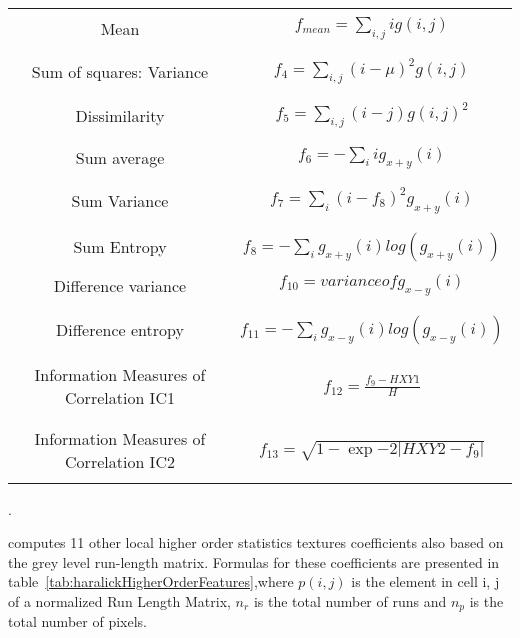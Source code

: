 \begin{table}
\begin{center}
\begin{tabular}{|c|c|}
\hline
& \\
Mean & $ f_{mean} = \sum_{i, j}i g(i, j) $ \\
& \\
\hline
& \\
Sum of squares: Variance & $ f_4 = \sum_{i, j}(i - \mu)^2 g(i, j) $ \\
& \\
\hline
& \\
Dissimilarity & $ f_5 = \sum_{i, j}(i - j) g(i, j)^2 $ \\
& \\
\hline
& \\
Sum average &  $ f_6 = -\sum_{i}i g_{x+y}(i) $ \\
& \\
\hline
& \\
Sum Variance & $ f_7 = \sum_{i}(i - f_8)^2 g_{x+y}(i) $ \\
& \\
\hline
& \\
Sum Entropy & $ f_8 = -\sum_{i}g_{x+y}(i) log (g_{x+y}(i)) $ \\
& \\
\hline
Difference variance & $ f_{10} = variance of g_{x-y}(i) $ \\
& \\
\hline
& \\
Difference entropy & $ f_{11} = -\sum_{i}g_{x-y}(i) log (g_{x-y}(i)) $ \\
& \\
\hline
& \\
Information Measures of Correlation IC1 & $ f_{12} = \frac{f_9 - HXY1}{H} $ \\
& \\
\hline
& \\
Information Measures of Correlation IC2 & $ f_{13} = \sqrt{1 - \exp{-2}|HXY2 - f_9|} $ \\
& \\
\hline
\end{tabular}
\end{center}
\label{tab:haralickAdvancedFeatures}
\end{table}.

 computes 11
other local higher order statistics textures coefficients also based on the grey
level run-length matrix. Formulas for these coefficients are presented in
table~\ref{tab:haralickHigherOrderFeatures},where $p(i, j)$ is the element in
cell i, j of a normalized Run Length Matrix, $n_r$ is the total number of runs
and $n_p$ is the total number of pixels.

